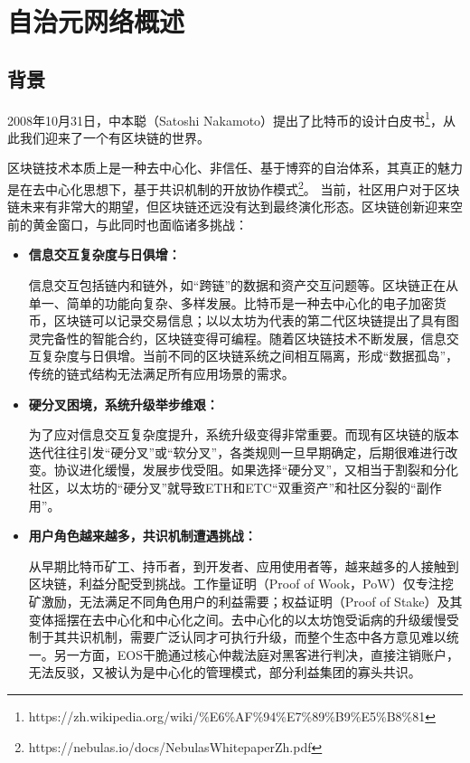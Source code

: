 \section{自治元网络概述}


\subsection{背景}

2008年10⽉31⽇，中本聪（Satoshi Nakamoto）提出了⽐特币的设计⽩皮书\footnote{https://zh.wikipedia.org/wiki/\%E6\%AF\%94\%E7\%89\%B9\%E5\%B8\%81}，从此我们迎来了一个有区块链的世界。

区块链技术本质上是⼀种去中心化、⾮信任、基于博弈的⾃治体系，其真正的魅力是在去中⼼化思想下，基于共识机制的开放协作模式\footnote{https://nebulas.io/docs/NebulasWhitepaperZh.pdf}。
当前，社区⽤户对于区块链未来有⾮常大的期望，但区块链还远没有达到最终演化形态。区块链创新迎来空前的黄金窗口，与此同时也面临诸多挑战：

\begin{itemize}
\item \textbf{信息交互复杂度与日俱增：}

信息交互包括链内和链外，如“跨链”的数据和资产交互问题等。区块链正在从单⼀、简单的功能向复杂、多样发展。比特币是一种去中心化的电子加密货币，区块链可以记录交易信息；以以太坊为代表的第二代区块链提出了具有图灵完备性的智能合约，区块链变得可编程。随着区块链技术不断发展，信息交互复杂度与日俱增。当前不同的区块链系统之间相互隔离，形成“数据孤岛”，传统的链式结构无法满足所有应用场景的需求。

\item \textbf{硬分叉困境，系统升级举步维艰：}

为了应对信息交互复杂度提升，系统升级变得非常重要。而现有区块链的版本迭代往往引发“硬分叉”或“软分叉”，各类规则一旦早期确定，后期很难进行改变。协议进化缓慢，发展步伐受阻。如果选择“硬分叉”，又相当于割裂和分化社区，以太坊的“硬分叉”就导致ETH和ETC“双重资产”和社区分裂的“副作用”。

\item \textbf{用户角色越来越多，共识机制遭遇挑战：}

从早期比特币矿工、持币者，到开发者、应用使用者等，越来越多的人接触到区块链，利益分配受到挑战。工作量证明（Proof of Wook，PoW）仅专注挖矿激励，无法满足不同角色用户的利益需要；权益证明（Proof of Stake）及其变体摇摆在去中心化和中心化之间。去中心化的以太坊饱受诟病的升级缓慢受制于其共识机制，需要广泛认同才可执行升级，而整个生态中各方意见难以统一。另一方面，EOS干脆通过核心仲裁法庭对黑客进行判决，直接注销账户，无法反驳，又被认为是中心化的管理模式，部分利益集团的寡头共识。
\end{itemize}

